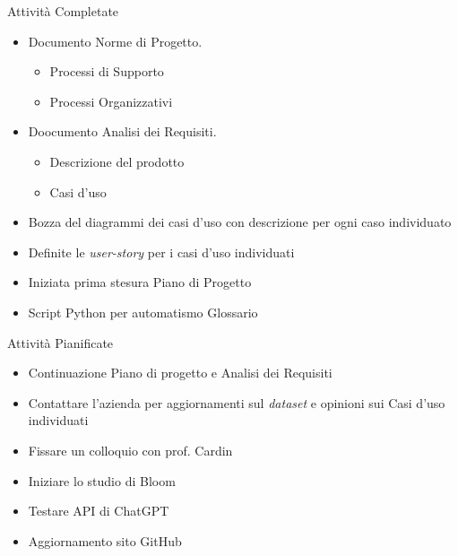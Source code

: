 \documentclass{beamer}
\begin{document}
\begin{frame}
    \begin{exampleblock}{Attività Completate}
        \begin{itemize}
            \item Documento Norme di Progetto.
            \begin{itemize}
                \item Processi di Supporto
                \item Processi Organizzativi
            \end{itemize}
            \item Doocumento Analisi dei Requisiti.
            \begin{itemize}
                \item Descrizione del prodotto
                \item Casi d'uso
            \end{itemize}
            \item Bozza del diagrammi dei casi d'uso con descrizione per ogni caso individuato
            \item Definite le \textit{user-story} per i casi d'uso individuati
            \item Iniziata prima stesura Piano di Progetto
            \item Script Python per automatismo Glossario
        \end{itemize}
    \end{exampleblock}
\end{frame}

\begin{frame}
    \begin{block}{Attività Pianificate}
        \begin{itemize}
            \item Continuazione Piano di progetto e Analisi dei Requisiti
            \item Contattare l'azienda per aggiornamenti sul \textit{dataset} e opinioni sui Casi d'uso individuati
            \item Fissare un colloquio con prof. Cardin
            \item Iniziare lo studio di Bloom
            \item Testare API di ChatGPT
            \item Aggiornamento sito GitHub
        \end{itemize}
    \end{block}
\end{frame}
\end{document}
